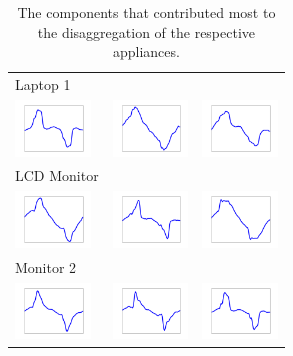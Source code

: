 \begin{table}[]
\begin{tabular}{lcc}
Laptop 1     \\
\includegraphics[width=20mm]{comps/comp_all36.pdf}        & \includegraphics[width=20mm]{comps/comp_all69.pdf}       & \includegraphics[width=20mm]{comps/comp_all90.pdf}   \\ \hline

LCD Monitor  \\
\includegraphics[width=20mm]{comps/comp_all81.pdf}        & \includegraphics[width=20mm]{comps/comp_all30.pdf}       & \includegraphics[width=20mm]{comps/comp_all55.pdf}   \\ \hline
Monitor 2      \\
\includegraphics[width=20mm]{comps/comp_all97.pdf}        & \includegraphics[width=20mm]{comps/comp_all13.pdf}       & \includegraphics[width=20mm]{comps/comp_all50.pdf} 

\end{tabular}
\caption[BOLT: The components that contributed most to the disaggregation of the respective appliances.]{The components that contributed most to the disaggregation of the respective appliances.}
\label{waveforms}
\end{table}
